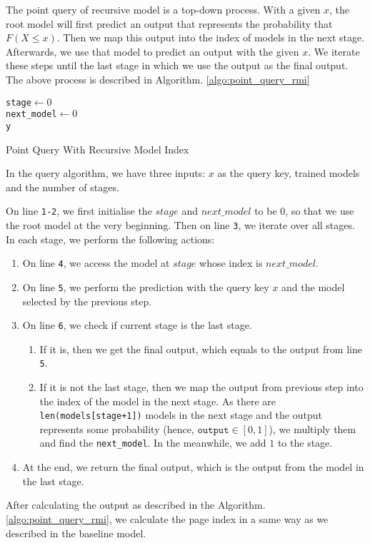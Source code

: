 The point query of recursive model is a top-down process. With a given $x$, the root model will first predict an output that represents the probability that $F(X\leq x)$. Then we map this output into the index of models in the next stage. Afterwards, we use that model to predict an output with the given $x$. We iterate these steps until the last stage in which we use the output as the final output. The above process is described in Algorithm. \ref{algo:point_query_rmi}


\begin{algorithm}[H]
    \SetAlgoLined
     \texttt{stage$\gets 0$} \\
 	 \texttt{next\_model$\gets 0$} \\
     \Return \texttt{y}
     \caption{Point Query With Recursive Model Index}
     \label{algo:point_query_rmi}
\end{algorithm}

In the query algorithm, we have three inputs: $x$ as the query key, trained models and the number of stages.

On line \texttt{1-2}, we first initialise the $stage$ and $next\_model$ to be $0$, so that we use the root model at the very beginning. Then on line \texttt{3}, we iterate over all stages. In each stage, we perform the following actions:
\begin{enumerate}
	\item On line \texttt{4}, we access the model at $stage$ whose index is $next\_model$.
	\item On line \texttt{5}, we perform the prediction with the query key $x$ and the model selected by the previous step.
	\item On line \texttt{6}, we check if current stage is the last stage. 
	\begin{enumerate}
		\item If it is, then we get the final output, which equals to the output from line \texttt{5}.
		\item If it is not the last stage, then we map the output from previous step into the index of the model in the next stage. As there are \texttt{len(models[stage+1])} models in the next stage and the output represents some probability (hence, $\texttt{output}\in [0,1]$), we multiply them and find the \texttt{next\_model}. In the meanwhile, we add $1$ to the stage.
	\end{enumerate}
	\item At the end, we return the final output, which is the output from the model in the last stage.
\end{enumerate}

After calculating the output as described in the Algorithm. \ref{algo:point_query_rmi}, we calculate the page index in a same way as we described in the baseline model. 
